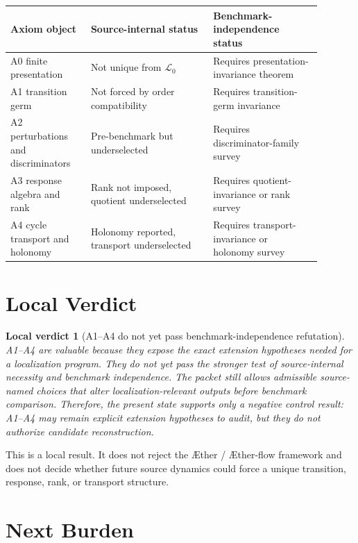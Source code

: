 \documentclass[11pt]{article}
\newcommand{\Aether}{\AE{}ther}
\newcommand{\Aflow}{\AE{}ther-flow}
\newcommand{\TheoryProgram}{\Aether{} / \Aflow{} framework}
\newcommand{\Lang}{\mathcal{L}_{0}}
\newtheorem{verdict}{Local verdict}
\begin{document}
\begin{center}
\begin{tabular}{p{0.23\linewidth}p{0.35\linewidth}p{0.31\linewidth}}
\textbf{Axiom object} & \textbf{Source-internal status} & \textbf{Benchmark-independence status} \\
\hline
A0 finite presentation & Not unique from \(\Lang\) & Requires presentation-invariance theorem \\
A1 transition germ & Not forced by order compatibility & Requires transition-germ invariance \\
A2 perturbations and discriminators & Pre-benchmark but underselected & Requires discriminator-family survey \\
A3 response algebra and rank & Rank not imposed, quotient underselected & Requires quotient-invariance or rank survey \\
A4 cycle transport and holonomy & Holonomy reported, transport underselected & Requires transport-invariance or holonomy survey \\
\end{tabular}
\end{center}

\section{Local Verdict}

\begin{verdict}[A1--A4 do not yet pass benchmark-independence refutation]
A1--A4 are valuable because they expose the exact extension hypotheses needed
for a localization program. They do not yet pass the stronger test of
source-internal necessity and benchmark independence. The packet still allows
admissible source-named choices that alter localization-relevant outputs
before benchmark comparison. Therefore, the present state supports only a
negative control result: A1--A4 may remain explicit extension hypotheses to
audit, but they do not authorize candidate reconstruction.
\end{verdict}

This is a local result. It does not reject the \TheoryProgram{} and does not
decide whether future source dynamics could force a unique transition,
response, rank, or transport structure.

\section{Next Burden}
\end{document}
